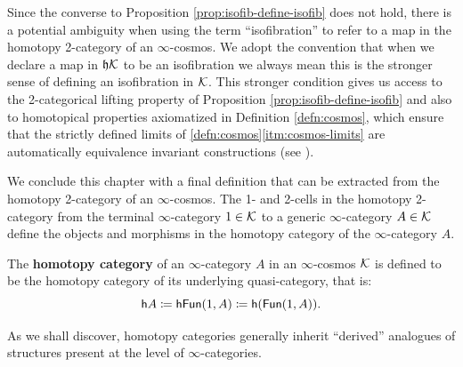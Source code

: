   \begin{con} Since the converse to Proposition \ref{prop:isofib-define-isofib} does not hold, there is a potential ambiguity when using the term ``isofibration'' to refer to a map in the homotopy 2-category of an $\infty$-cosmos. We adopt the convention that when we declare  a map in $\mathfrak{h}{\mathord{\mathcal{K}}}$ to be an isofibration we always mean this is the stronger sense of defining an isofibration in ${\mathord{\mathcal{K}}}$. This stronger condition gives us access to the 2-categorical lifting property of Proposition \ref{prop:isofib-define-isofib} and also to homotopical properties axiomatized in Definition \ref{defn:cosmos}, which ensure that the strictly defined limits of \ref{defn:cosmos}\ref{itm:cosmos-limits} are automatically equivalence invariant constructions (see \cite[6.2.8,\S C.1]{RiehlVerity:2022eo}). %
  \end{con}

  We conclude this chapter with a final definition that can be extracted from the homotopy 2-category of an $\infty$-cosmos. The 1- and 2-cells in the homotopy 2-category from the terminal $\infty$-category $1 \in {\mathord{\mathcal{K}}}$ to a generic $\infty$-category $A \in {\mathord{\mathcal{K}}}$ define the objects and morphisms in the homotopy category of the $\infty$-category $A$.

  \begin{definition}\label{defn:htpy-cat-of-infinity-cat}
    The \textbf{homotopy category} of an $\infty$-category $A$ in an $\infty$-cosmos ${\mathord{\mathcal{K}}}$ is defined to be the homotopy category of its underlying quasi-category, that is:
  \[ {\mathord{\mathsf{h}}} A \coloneq {\mathord{\mathsf{hFun}}}(1,A) \coloneq {\mathord{\mathsf{h}}}({\mathord{\mathsf{Fun}}}(1,A)).\]
  \end{definition}

  As we shall discover, homotopy categories generally inherit ``derived'' analogues of structures present at the level of $\infty$-categories. %
